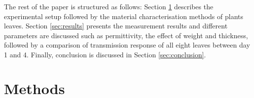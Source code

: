 \documentclass[preprints,article,accept,moreauthors,pdftex]{Definitions/mdpi}
\renewcommand{\^}{\hat}  %
\begin{document}
The rest of the paper is structured as follows: Section \ref{sec:Experimental} describes the experimental setup followed by the material characterisation methods of plants leaves. {Section }\ref{sec:results}{ presents the measurement results and different parameters are discussed such as permittivity, the effect of weight and thickness, followed by a comparison of transmission response of all eight leaves between day 1 and 4}. Finally, conclusion is discussed in Section \ref{sec:conclusion}.
\section{Methods}\label{sec:Experimental}
%
\end{document}
